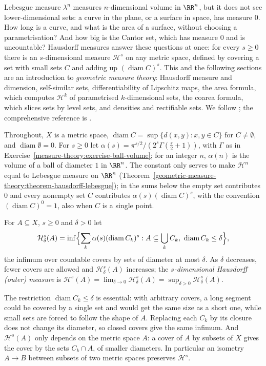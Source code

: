 Lebesgue measure $\lambda^n$ measures $n$-dimensional volume in $\RR^n$, but it does not see lower-dimensional sets: a curve in the plane, or a surface in space, has measure $0$. How long is
a curve, and what is the area of a surface, without choosing a parametrisation? And how big is the Cantor set, which has measure $0$ and is uncountable? Hausdorff measures answer these
questions at once: for every $s \geq 0$ there is an $s$-dimensional measure $\mathcal{H}^s$ on any metric space, defined by covering a set with small sets $C$ and adding up
$(\operatorname{diam}C)^s$. This and the following sections are an introduction to \emph{geometric measure theory}: Hausdorff measure and dimension, self-similar sets, differentiability of
Lipschitz maps, the area formula, which computes $\mathcal{H}^k$ of parametrised $k$-dimensional sets, the coarea formula, which slices sets by level sets, and densities and rectifiable sets. We follow \cite[Chapters 2--3]{evans-gariepy}; the comprehensive reference is
\cite{federer-gmt}.

Throughout, $X$ is a metric space, $\operatorname{diam}C = \sup\{d(x, y) : x, y \in C\}$ for $C \neq \emptyset$, and $\operatorname{diam}\emptyset = 0$. For $s \geq 0$ let
$\alpha(s) = \pi^{s/2}/(2^s\Gamma(\frac s2 + 1))$, with $\Gamma$ as in Exercise~\ref{measure-theory:exercise-ball-volume}; for an integer $n$, $\alpha(n)$ is the volume of a ball of
diameter $1$ in $\RR^n$. The constant only serves to make $\mathcal{H}^n$ equal to Lebesgue measure on $\RR^n$ (Theorem~\ref{geometric-measure-theory:theorem-hausdorff-lebesgue}); in the sums below
the empty set contributes $0$ and every nonempty set $C$ contributes $\alpha(s)(\operatorname{diam}C)^s$, with the convention $(\operatorname{diam}C)^0 = 1$, also when $C$ is a
single point.

\begin{definition}\label{geometric-measure-theory:definition-hausdorff}
For $A \subseteq X$, $s \geq 0$ and $\delta > 0$ let
\[
\mathcal{H}^s_\delta(A) = \inf\Bigl\{\sum_k\alpha(s)(\operatorname{diam}C_k)^s : A \subseteq \bigcup_kC_k,\ \operatorname{diam}C_k \leq \delta\Bigr\},
\]
the infimum over countable covers by sets of diameter at most $\delta$. As $\delta$ decreases, fewer covers are allowed and $\mathcal{H}^s_\delta(A)$ increases; the
\emph{$s$-dimensional Hausdorff (outer) measure} is $\mathcal{H}^s(A) = \lim_{\delta \to 0}\mathcal{H}^s_\delta(A) = \sup_{\delta > 0}\mathcal{H}^s_\delta(A)$.
\end{definition}

The restriction $\operatorname{diam}C_k \leq \delta$ is essential: with arbitrary covers, a long segment could be covered by a single set and would get the same size as a short one, while
small sets are forced to follow the shape of $A$. Replacing each $C_k$ by its closure does not change its diameter, so closed covers give the same infimum. And $\mathcal{H}^s(A)$ only
depends on the metric space $A$: a cover of $A$ by subsets of $X$ gives the cover by the sets $C_k \cap A$, of smaller diameters. In particular an isometry $A \to B$ between subsets of two
metric spaces preserves $\mathcal{H}^s$.

